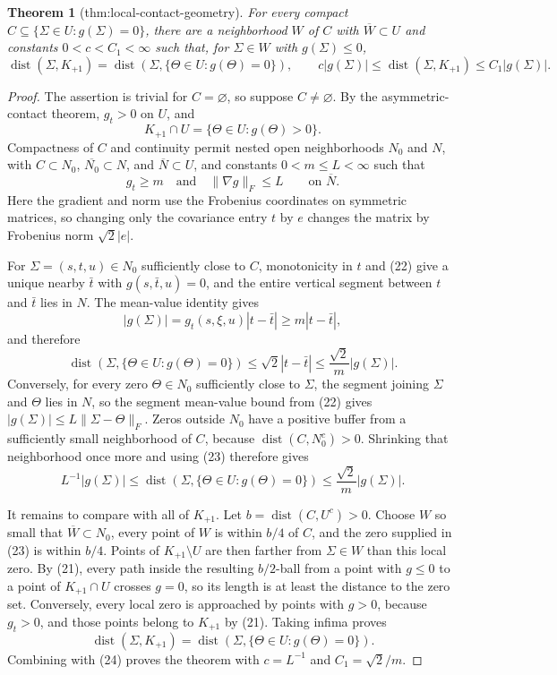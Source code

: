 \documentclass{article}
\newtheorem{theorem}{Theorem}
\begin{document}
\begin{theorem}[thm:local-contact-geometry]\label{thm:local-contact-geometry}
For every compact \(C\subseteq\{\Sigma\in U:g(\Sigma)=0\}\), there are a neighborhood \(W\) of \(C\) with \(\overline W\subset U\) and constants \(0<c<C_1<\infty\) such that, for \(\Sigma\in W\) with \(g(\Sigma)\le0\), \[\operatorname{dist}(\Sigma,K_{+1})=\operatorname{dist}(\Sigma,\{\Theta\in U:g(\Theta)=0\}),\qquad c|g(\Sigma)|\le\operatorname{dist}(\Sigma,K_{+1})\le C_1|g(\Sigma)|.\]
\end{theorem}
\begin{proof}
The assertion is trivial for \(C=\varnothing\), so suppose \(C\ne\varnothing\).  By the asymmetric-contact theorem, \(g_t>0\) on \(U\), and
\[
 K_{+1}\cap U=\{\Theta\in U:g(\Theta)>0\}. \tag{21}
\]
Compactness of \(C\) and continuity permit nested open neighborhoods \(N_0\) and \(N\), with \(C\subset N_0\), \(\overline{N_0}\subset N\), and \(\overline N\subset U\), and constants \(0<m\le L<\infty\) such that
\[
 g_t\ge m\quad\text{and}\quad \lVert\nabla g\rVert_F\le L
 \qquad\text{on }\overline N. \tag{22}
\]
Here the gradient and norm use the Frobenius coordinates on symmetric matrices, so changing only the covariance entry \(t\) by \(e\) changes the matrix by Frobenius norm \(\sqrt2|e|\).

For \(\Sigma=(s,t,u)\in N_0\) sufficiently close to \(C\), monotonicity in \(t\) and (22) give a unique nearby \(\bar t\) with \(g(s,\bar t,u)=0\), and the entire vertical segment between \(t\) and \(\bar t\) lies in \(N\).  The mean-value identity gives
\[
 |g(\Sigma)|=g_t(s,\xi,u)|t-\bar t|\ge m|t-\bar t|,
\]
and therefore
\[
 \operatorname{dist}(\Sigma,\{\Theta\in U:g(\Theta)=0\})
 \le\sqrt2|t-\bar t|\le\frac{\sqrt2}{m}|g(\Sigma)|. \tag{23}
\]
Conversely, for every zero \(\Theta\in N_0\) sufficiently close to \(\Sigma\), the segment joining \(\Sigma\) and \(\Theta\) lies in \(N\), so the segment mean-value bound from (22) gives \(|g(\Sigma)|\le L\lVert\Sigma-\Theta\rVert_F\).  Zeros outside \(N_0\) have a positive buffer from a sufficiently small neighborhood of \(C\), because \(\operatorname{dist}(C,N_0^c)>0\).  Shrinking that neighborhood once more and using (23) therefore gives
\[
 L^{-1}|g(\Sigma)|
 \le\operatorname{dist}(\Sigma,\{\Theta\in U:g(\Theta)=0\})
 \le\frac{\sqrt2}{m}|g(\Sigma)|. \tag{24}
\]

It remains to compare with all of \(K_{+1}\).  Let \(b=\operatorname{dist}(C,U^c)>0\).  Choose \(W\) so small that \(\overline W\subset N_0\), every point of \(W\) is within \(b/4\) of \(C\), and the zero supplied in (23) is within \(b/4\).  Points of \(K_{+1}\setminus U\) are then farther from \(\Sigma\in W\) than this local zero.  By (21), every path inside the resulting \(b/2\)-ball from a point with \(g\le0\) to a point of \(K_{+1}\cap U\) crosses \(g=0\), so its length is at least the distance to the zero set.  Conversely, every local zero is approached by points with \(g>0\), because \(g_t>0\), and those points belong to \(K_{+1}\) by (21).  Taking infima proves
\[
 \operatorname{dist}(\Sigma,K_{+1})
 =\operatorname{dist}(\Sigma,\{\Theta\in U:g(\Theta)=0\}).
\]
Combining with (24) proves the theorem with \(c=L^{-1}\) and \(C_1=\sqrt2/m\).
\end{proof}
\end{document}
